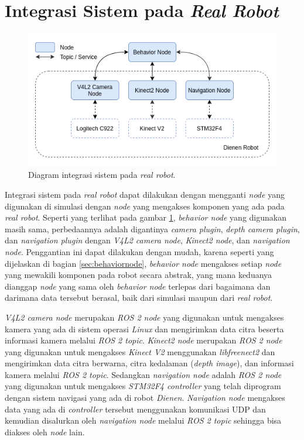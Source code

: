 \section{Integrasi Sistem pada \emph{Real Robot}}
\label{sec:integrasirobot}

\begin{figure} [ht]
  \centering
  \includegraphics[scale=0.5]{gambar/integrasi-real-robot.png}
  \caption{Diagram integrasi sistem pada \emph{real robot}.}
  \label{fig:integrasirealrobot}
\end{figure}

Integrasi sistem pada \emph{real robot} dapat dilakukan dengan mengganti \emph{node} yang digunakan di simulasi dengan \emph{node} yang mengakses komponen yang ada pada \emph{real robot}.
Seperti yang terlihat pada gambar \ref{fig:integrasirealrobot},
  \emph{behavior node} yang digunakan masih sama,
  perbedaannya adalah digantinya \emph{camera plugin}, \emph{depth camera plugin}, dan \emph{navigation plugin} dengan \emph{V4L2 camera node}, \emph{Kinect2 node}, dan \emph{navigation node}.
Penggantian ini dapat dilakukan dengan mudah,
  karena seperti yang dijelaskan di bagian \ref{sec:behaviornode},
  \emph{behavior node} mengakses setiap \emph{node} yang mewakili komponen pada robot secara abstrak,
  yang mana keduanya dianggap \emph{node} yang sama oleh \emph{behavior node} terlepas dari bagaimana dan darimana data tersebut berasal,
  baik dari simulasi maupun dari \emph{real robot}.

\emph{V4L2 camera node} merupakan \emph{ROS 2 node} yang digunakan untuk mengakses kamera yang ada di sistem operasi \emph{Linux} dan mengirimkan data citra beserta informasi kamera melalui \emph{ROS 2 topic}.
\emph{Kinect2 node} merupakan \emph{ROS 2 node} yang digunakan untuk mengakses \emph{Kinect V2} menggunakan \emph{libfreenect2} dan mengirimkan data citra berwarna, citra kedalaman (\emph{depth image}), dan informasi kamera melalui \emph{ROS 2 topic}.
Sedangkan \emph{navigation node} adalah \emph{ROS 2 node} yang digunakan untuk mengakses \emph{STM32F4 controller} yang telah diprogram dengan sistem navigasi yang ada di robot \emph{Dienen}.
\emph{Navigation node} mengakses data yang ada di \emph{controller} tersebut menggunakan komunikasi UDP dan kemudian disalurkan oleh \emph{navigation node} melalui \emph{ROS 2 topic} sehingga bisa diakses oleh \emph{node} lain.

